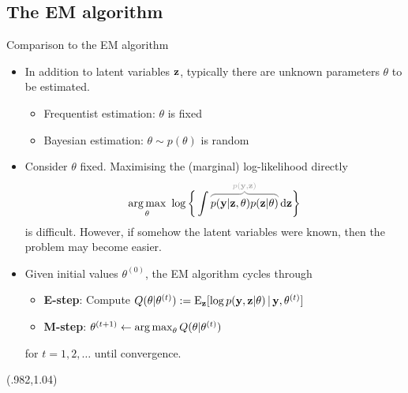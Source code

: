 \subsection{The EM algorithm}
\begin{frame}[label=emalg]{Comparison to the EM algorithm }
  \begin{itemize}
    \setlength\itemsep{0.5em}
    \item In addition to latent variables ${\mathbf z}$, typically there are unknown parameters $\theta$ to be estimated.
    \begin{itemize}
      \item Frequentist estimation: $\theta$ is fixed
      \item Bayesian estimation: $\theta \sim p(\theta)$ is random
    \end{itemize}
    \item Consider $\theta$ fixed. Maximising the (marginal) log-likelihood directly
      \begin{align*}
        \argmax_\theta \ \log \bigg\{\int \myoverbrace{p(\by|\bz,\theta)p(\bz|\theta)}{p(\by,\bz)} \d\bz \bigg\}
      \end{align*}
    is difficult. However, if somehow the latent variables were known, then the problem may become easier.
    \item Given initial values $\theta^{(0)}$, the EM algorithm cycles through\vspace{0.2em}
        \begin{itemize}\setlength\itemsep{0.2em}
          \item \textbf{E-step}: Compute $Q(\theta|\theta^{(t)}) := \operatorname{E}_{\mathbf z}[\log p({\mathbf y},{\mathbf z}|\theta) \,|\, {\mathbf y},\theta^{(t)}] $ \vspace{0.3em}
          \item \textbf{M-step}: $\theta^{(t+1)} \gets \operatorname*{arg\,max}_\theta Q(\theta|\theta^{(t)})$
        \end{itemize}
        for $t=1,2,\dots$ until convergence.
  \end{itemize}
    \begin{textblock*}{3cm}(.982\textwidth,1.04\textheight)%
    \hyperlink{compareemalg}{}      
  \end{textblock*}
\end{frame}

